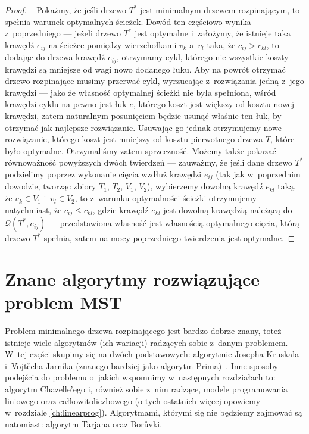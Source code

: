 \begin{proof}~\cite[$519$]{Ahuja:1993:NFT:137406}
	Pokażmy, że jeśli drzewo $T^{\ast}$ jest minimalnym drzewem rozpinającym, to spełnia warunek optymalnych ścieżek.
	Dowód ten częściowo wynika z~poprzedniego --- jeżeli drzewo $T^{\ast}$ jest optymalne i~założymy, że istnieje taka krawędź $e_{ij}$ na ścieżce pomiędzy wierzchołkami $v_{k}$ a~$v_{l}$ taka, że $c_{ij} > c_{kl}$, to dodając do drzewa krawędź $e_{ij}$, otrzymamy cykl, którego nie wszystkie koszty krawędzi są mniejsze od wagi nowo dodanego łuku.
	Aby na powrót otrzymać drzewo rozpinające musimy przerwać cykl, wyrzucając z~rozwiązania jedną z~jego krawędzi --- jako że własność optymalnej ścieżki nie była spełniona, wśród krawędzi cyklu na pewno jest łuk $e$, którego koszt jest większy od kosztu nowej krawędzi, zatem naturalnym posunięciem będzie usunąć właśnie ten łuk, by otrzymać jak najlepsze rozwiązanie.
	Usuwając go jednak otrzymujemy nowe rozwiązanie, którego koszt jest mniejszy od kosztu pierwotnego drzewa $T$, które było optymalne.
	Otrzymaliśmy zatem sprzeczność.
	Możemy także pokazać równoważność powyższych dwóch twierdzeń --- zauważmy, że jeśli dane drzewo $T^{\ast}$ podzielimy poprzez wykonanie cięcia wzdłuż krawędzi $e_{ij}$ (tak jak w~poprzednim dowodzie, tworząc zbiory $T_{1}$, $T_{2}$, $V_{1}$, $V_{2}$), wybierzemy dowolną krawędź $e_{kl}$ taką, że $v_{k} \in V_{1}$ i~$v_{l} \in V_{2}$, to z~warunku optymalności ścieżki otrzymujemy natychmiast, że $c_{ij} \leqslant c_{kl}$, gdzie krawędź $e_{kl}$ jest dowolną krawędzią należącą do $\mathcal{Q} \left( T^{\ast}, e_{ij} \right)$ --- przedstawiona własność jest własnością optymalnego cięcia, którą drzewo $T^{\ast}$ spełnia, zatem na mocy poprzedniego twierdzenia jest optymalne.
\end{proof}




\section{Znane algorytmy rozwiązujące problem MST}




Problem minimalnego drzewa rozpinającego jest bardzo dobrze znany, toteż istnieje wiele algorytmów (ich wariacji) radzących sobie z~danym problemem.
W~tej części skupimy się na dwóch podstawowych: algorytmie Josepha Kruskala~\cite[$520$--$522$]{Ahuja:1993:NFT:137406} i~Vojtěcha Jarníka (znanego bardziej jako algorytm Prima)~\cite[$523$--$525$]{Ahuja:1993:NFT:137406}.
Inne sposoby podejścia do problemu o~jakich wspomnimy w~następnych rozdziałach to: algorytm Chazelle'ego i, również sobie z~nim radzące, modele programowania liniowego oraz całkowitoliczbowego (o tych ostatnich więcej opowiemy w~rozdziale \ref{ch:linearprog}).
Algorytmami, którymi się nie będziemy zajmować są natomiast: algorytm Tarjana oraz Borůvki.



